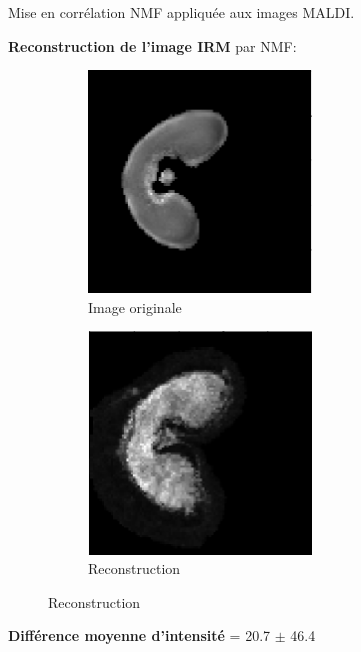 \documentclass[10pt]{beamer}
\begin{document}
\begin{frame}{Mise en corrélation}
  NMF appliquée aux images MALDI.
  
  \textbf{Reconstruction de l'image IRM} par NMF:
  \begin{figure}[ht]
    \begin{subfigure}[t]{0.5\textwidth}
      \centering
      \includegraphics[width=0.65\textwidth]{fig/mri_recital}
      \caption{Image originale}
      \label{subfig:}
    \end{subfigure}%
    \begin{subfigure}[t]{0.5\textwidth}
      \centering
      \includegraphics[width=0.65\textwidth]{fig/mri_recital_reconstructed}
      \caption{Reconstruction}
      \label{subfig:mri_recital_reconstructed}
    \end{subfigure}%
  \end{figure}

  \textbf{Différence moyenne d'intensité} = 20.7 $\pm$ 46.4
\end{frame}
\end{document}
